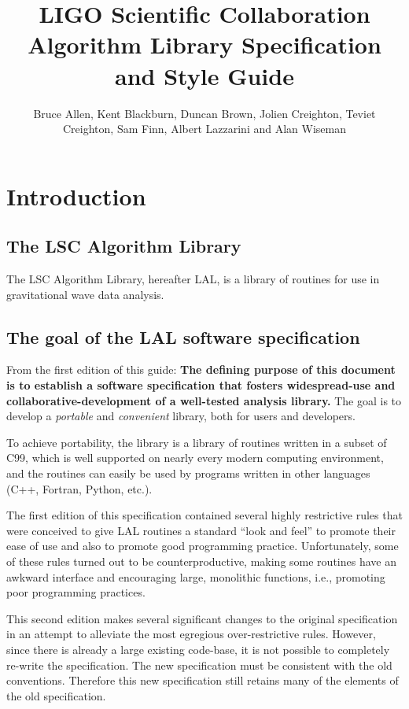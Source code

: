 \documentclass[10pt]{ligodcc}
\title{LIGO Scientific Collaboration Algorithm Library Specification and Style
Guide}
\author{Bruce Allen, Kent Blackburn, Duncan Brown, Jolien Creighton, Teviet
Creighton, Sam Finn, Albert Lazzarini and Alan Wiseman}
\begin{document}
\maketitle


\tableofcontents


\section{Introduction}
\label{s:intro}


\subsection{The LSC Algorithm Library}

The LSC Algorithm Library, hereafter LAL, is a library of routines for use in
gravitational wave data analysis.


\subsection{The goal of the LAL software specification}

From the first edition of this guide: \textbf{The defining purpose of this
document is to establish a software specification that fosters widespread-use
and collaborative-development of a well-tested analysis library.}  The goal is
to develop a \emph{portable} and \emph{convenient} library, both for users and
developers.

To achieve portability, the library is a library of routines written in a
subset of C99, which is well supported on nearly every modern computing
environment, and the routines can easily be used by programs written in
other languages (C++, Fortran, Python, etc.).

The first edition of this specification contained several highly restrictive
rules that were conceived to give LAL routines a standard ``look and feel''
to promote their ease of use and also to promote good programming practice.
Unfortunately, some of these rules turned out to be counterproductive, making
some routines have an awkward interface and encouraging large, monolithic
functions, i.e., promoting poor programming practices.

This second edition makes several significant changes to the original
specification in an attempt to alleviate the most egregious over-restrictive
rules.  However, since there is already a large existing code-base, it is
not possible to completely re-write the specification.  The new specification
must be consistent with the old conventions.  Therefore this new specification
still retains many of the elements of the old specification.
\end{document}
